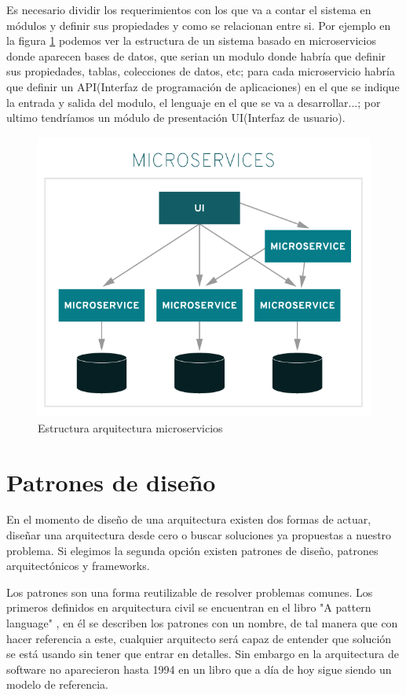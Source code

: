\documentclass[12pt]{report} %
\begin{document}
	Es necesario dividir los requerimientos con los que va a contar el sistema en módulos y definir sus propiedades y como se relacionan entre si. Por ejemplo en la figura \ref{fig:microservices} podemos ver la estructura de un sistema basado en microservicios donde aparecen bases de datos, que serian un modulo donde habría que definir sus propiedades, tablas, colecciones de datos, etc; para cada microservicio habría que definir un API(Interfaz de programación de aplicaciones) en el que se indique la entrada y salida del modulo, el lenguaje en el que se va a desarrollar...; por ultimo tendríamos un módulo de presentación UI(Interfaz de usuario).
	\begin{figure}
		\centering
		\includegraphics[width=0.7\linewidth]{imagenes/monolithic-vs-microservices}
		\caption{Estructura arquitectura microservicios}
		\label{fig:microservices}
	\end{figure}

	\section{Patrones de diseño}
	 En el momento de diseño de una arquitectura existen dos formas de actuar, diseñar una arquitectura desde cero o buscar soluciones ya propuestas a nuestro problema. Si elegimos la segunda opción existen patrones de diseño, patrones arquitectónicos y frameworks.
	 
	 Los patrones son una forma reutilizable de resolver problemas comunes. Los primeros definidos en arquitectura civil se encuentran en el libro "A pattern language" \cite{PatternLanguage}, en él se describen los patrones con un nombre, de tal manera que con hacer referencia a este, cualquier arquitecto será capaz de entender que solución se está usando sin tener que entrar en detalles. Sin embargo en la arquitectura de software no aparecieron hasta 1994 en un libro que a día de hoy sigue siendo un modelo de referencia\cite{gamma2002patrones}.
	 
\end{document}
